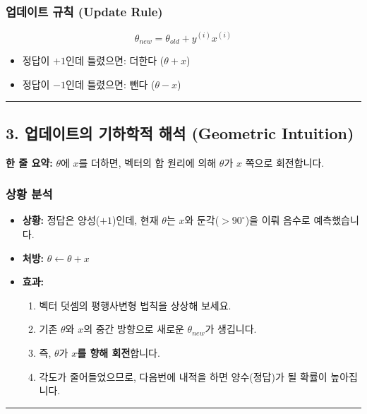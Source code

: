\documentclass[11pt,a4paper]{book}
\theoremstyle{definition}
\begin{document}
\subsubsection*{업데이트 규칙 (Update Rule)}
$$ \theta_{new} = \theta_{old} + y^{(i)} x^{(i)} $$
\begin{itemize}
    \item 정답이 $+1$인데 틀렸으면: 더한다 ($\theta + x$)
    \item 정답이 $-1$인데 틀렸으면: 뺀다 ($\theta - x$)
\end{itemize}

\vspace{0.5cm}\hrule\vspace{0.5cm}

\subsection{3. 업데이트의 기하학적 해석 (Geometric Intuition)}

\begin{conceptbox}[title={개념 3: 벡터의 회전}]
\textbf{한 줄 요약:} $\theta$에 $x$를 더하면, 벡터의 합 원리에 의해 $\theta$가 $x$ 쪽으로 회전합니다.
\end{conceptbox}


\subsubsection*{상황 분석}
\begin{itemize}
    \item \textbf{상황:} 정답은 양성($+1$)인데, 현재 $\theta$는 $x$와 둔각($>90^\circ$)을 이뤄 음수로 예측했습니다.
    \item \textbf{처방:} $\theta \leftarrow \theta + x$
    \item \textbf{효과:}
    \begin{enumerate}
        \item 벡터 덧셈의 평행사변형 법칙을 상상해 보세요.
        \item 기존 $\theta$와 $x$의 중간 방향으로 새로운 $\theta_{new}$가 생깁니다.
        \item 즉, $\theta$가 \textbf{$x$를 향해 회전}합니다.
        \item 각도가 줄어들었으므로, 다음번에 내적을 하면 양수(정답)가 될 확률이 높아집니다.
    \end{enumerate}
\end{itemize}

\vspace{0.5cm}\hrule\vspace{0.5cm}
\end{document}
